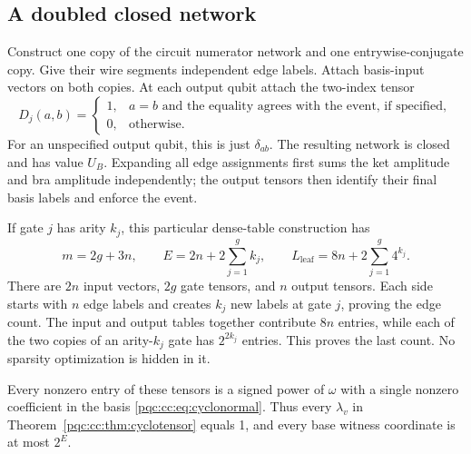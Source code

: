 \documentclass[11pt,letterpaper]{article}
\numberwithin{equation}{section}
\theoremstyle{definition}
\theoremstyle{remark}
\newcommand{\Lleaf}{L_{\mathrm{leaf}}}
\begin{document}
\subsection{A doubled closed network}

Construct one copy of the circuit numerator network and one entrywise-conjugate
copy. Give their wire segments independent edge labels. Attach basis-input
vectors on both copies. At each output qubit attach the two-index tensor
\begin{equation}
 D_j(a,b)=
 \begin{cases}
  1,&a=b\text{ and the equality agrees with the event, if specified},\\
  0,&\text{otherwise}.
 \end{cases}
\label{pqc:cc:eq:outputtensor}
\end{equation}
For an unspecified output qubit, this is just $\delta_{ab}$. The resulting
network is closed and has value $U_B$. Expanding all edge assignments first
sums the ket amplitude and bra amplitude independently; the output tensors
then identify their final basis labels and enforce the event.

If gate $j$ has arity $k_j$, this particular dense-table construction has
\begin{equation}
 m=2g+3n,\qquad E=2n+2\sum_{j=1}^g k_j,\qquad
 \Lleaf=8n+2\sum_{j=1}^g4^{k_j}.
\label{pqc:cc:eq:quantum-network-counts}
\end{equation}
There are $2n$ input vectors, $2g$ gate tensors, and $n$ output tensors.
Each side starts with $n$ edge labels and creates $k_j$ new labels at gate $j$,
proving the edge count. The input and output tables together contribute $8n$
entries, while each of the two copies of an arity-$k_j$ gate has $2^{2k_j}$
entries. This proves the last count. No sparsity optimization is hidden in it.

Every nonzero entry of these tensors is a signed power of $\omega$ with a
single nonzero coefficient in the basis \eqref{pqc:cc:eq:cyclonormal}. Thus every
$\lambda_v$ in Theorem~\ref{pqc:cc:thm:cyclotensor} equals 1, and every base witness
coordinate is at most $2^E$.
\end{document}
